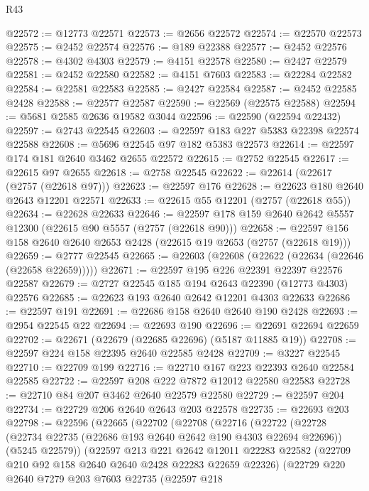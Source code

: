 \begin{lexlean}{R43}
\begin{coremodule}
@22572 := @12773 @22571
@22573 := @2656 @22572
@22574 := @22570 @22573
@22575 := @2452 @22574
@22576 := @189 @22388
@22577 := @2452 @22576
@22578 := @4302 @4303
@22579 := @4151 @22578
@22580 := @2427 @22579
@22581 := @2452 @22580
@22582 := @4151 @7603
@22583 := @22284 @22582
@22584 := @22581 @22583
@22585 := @2427 @22584
@22587 := @2452 @22585 @2428
@22588 := @22577 @22587
@22590 := @22569 (@22575 @22588)
@22594 := @5681 @2585 @2636 @19582 @3044
@22596 := @22590 (@22594 @22432)
@22597 := @2743 @22545
@22603 := @22597 @183 @227 @5383 @22398 @22574 @22588
@22608 := @5696 @22545 @97 @182 @5383 @22573
@22614 := @22597 @174 @181 @2640 @3462 @2655 @22572
@22615 := @2752 @22545
@22617 := @22615 @97 @2655
@22618 := @2758 @22545
@22622 := @22614 (@22617 (@2757 (@22618 @97)))
@22623 := @22597 @176
@22628 := @22623 @180 @2640 @2643 @12201 @22571
@22633 := @22615 @55 @12201 (@2757 (@22618 @55))
@22634 := @22628 @22633
@22646 := @22597 @178 @159 @2640 @2642 @5557 @12300 (@22615 @90 @5557 (@2757 (@22618 @90)))
@22658 := @22597 @156 @158 @2640 @2640 @2653 @2428 (@22615 @19 @2653 (@2757 (@22618 @19)))
@22659 := @2777 @22545
@22665 := @22603 (@22608 (@22622 (@22634 (@22646 (@22658 @22659)))))
@22671 := @22597 @195 @226 @22391 @22397 @22576 @22587
@22679 := @2727 @22545 @185 @194 @2643 @22390 (@12773 @4303) @22576
@22685 := @22623 @193 @2640 @2642 @12201 @4303 @22633
@22686 := @22597 @191
@22691 := @22686 @158 @2640 @2640 @190 @2428
@22693 := @2954 @22545 @22
@22694 := @22693 @190
@22696 := @22691 @22694 @22659
@22702 := @22671 (@22679 (@22685 @22696) (@5187 @11885 @19))
@22708 := @22597 @224 @158 @22395 @2640 @22585 @2428
@22709 := @3227 @22545
@22710 := @22709 @199
@22716 := @22710 @167 @223 @22393 @2640 @22584 @22585
@22722 := @22597 @208 @222 @7872 @12012 @22580 @22583
@22728 := @22710 @84 @207 @3462 @2640 @22579 @22580
@22729 := @22597 @204
@22734 := @22729 @206 @2640 @2643 @203 @22578
@22735 := @22693 @203
@22798 := @22596
    (@22665
      (@22702
        (@22708
          (@22716
            (@22722
              (@22728
                (@22734 @22735 (@22686 @193 @2640 @2642 @190 @4303 @22694 @22696))
                (@5245 @22579))
              (@22597
                @213
                @221
                @2642
                @12011
                @22283
                @22582
                (@22709 @210 @92 @158 @2640 @2640 @2428 @22283 @22659 @22326)
                (@22729
                  @220
                  @2640
                  @7279
                  @203
                  @7603
                  @22735
                  (@22597
                    @218

\end{coremodule}
\end{lexlean}
